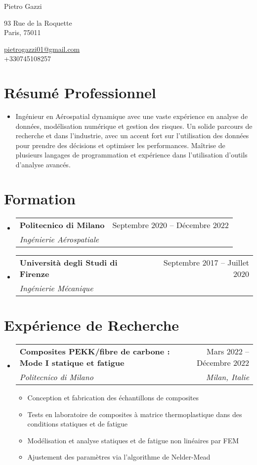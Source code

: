 \documentclass[letterpaper,11pt]{article}
\makeatletter
\newcommand{\resumeItem}[1]{
  \item{
    {#1 \vspace{-4pt}}
  }
}
\newcommand{\resumeSubheading}[4]{
  \vspace{-2pt}\item
    \begin{tabular*}{0.97\textwidth}[t]{l@{\extracolsep{\fill}}r}
      \textbf{#1} & #2 \\
      \textit{\small #3} & \textit{\small #4} \\
    \end{tabular*}\vspace{-10pt}
}
\newcommand{\resumeSubHeadingListStart}{\begin{itemize}[leftmargin=0.15in, label={}]}
\newcommand{\resumeSubHeadingListEnd}{\end{itemize}}
\newcommand{\resumeItemListStart}{\begin{itemize}}
\newcommand{\resumeItemListEnd}{\end{itemize}\vspace{-2pt}}
\makeatother
\begin{document}
\begin{center}
    {\LARGE Pietro Gazzi} \\ \vspace{0pt} 
    \begin{multicols}{2}
    \begin{flushleft}
    \large{93 Rue de la Roquette} \\
    \large{Paris, 75011 } \\
    \end{flushleft}
    
    \begin{flushright}
    \href{mailto:pietrogazzi01@gmail.com}{\large{pietrogazzi01@gmail.com}}\\
    \large{+330745108257}
    \end{flushright}
    \end{multicols}
\end{center}

\section{Résumé Professionnel}
\resumeSubHeadingListStart
\item{
    Ingénieur en Aérospatial dynamique avec une vaste expérience en analyse de données, modélisation numérique et gestion des risques. Un solide parcours de recherche et dans l'industrie, avec un accent fort sur l'utilisation des données pour prendre des décisions et optimiser les performances. Maîtrise de plusieurs langages de programmation et expérience dans l'utilisation d'outils d'analyse avancés.
}
\resumeSubHeadingListEnd

\section{Formation}
\resumeSubHeadingListStart
    \resumeSubheading
        {Politecnico di Milano}{Septembre 2020 -- Décembre 2022}
        {Ingénierie Aérospatiale}{}
    \resumeSubheading
        {Università degli Studi di Firenze}{Septembre 2017 -- Juillet 2020}
        {Ingénierie Mécanique}{}
\resumeSubHeadingListEnd

\section{Expérience de Recherche}
\resumeSubHeadingListStart
    \resumeSubheading
        {Composites PEKK/fibre de carbone : Mode I statique et fatigue}{Mars 2022 -- Décembre 2022}
        {Politecnico di Milano}{Milan, Italie}
      \resumeItemListStart
        \resumeItem{Conception et fabrication des échantillons de composites}
        \resumeItem{Tests en laboratoire de composites à matrice thermoplastique dans des conditions statiques et de fatigue}
        \resumeItem{Modélisation et analyse statiques et de fatigue non linéaires par FEM}
        \resumeItem{Ajustement des paramètres via l'algorithme de Nelder-Mead}
    \resumeItemListEnd
\resumeSubHeadingListEnd
\end{document}

